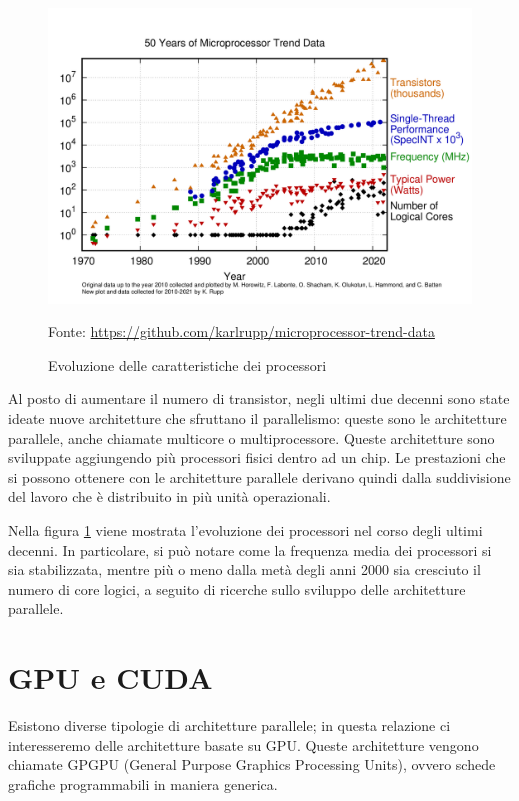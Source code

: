 \documentclass[12pt,a4paper,openright,twoside]{report}
\newcommand{\source}[1]{\vspace{-10pt} \caption*{\scriptsize Fonte: {#1}} }
\begin{document}
\begin{figure}[h]
    \centering
    \includegraphics[width=\textwidth]{50-years-processor-trend.png}
    \caption{Evoluzione delle caratteristiche dei processori}
    \source{\url{https://github.com/karlrupp/microprocessor-trend-data}}
    \label{img:trend_proc}
\end{figure}

Al posto di aumentare il numero di transistor, negli ultimi due decenni sono state ideate nuove architetture che sfruttano il parallelismo: queste sono le architetture parallele, anche chiamate multicore o multiprocessore. Queste architetture sono sviluppate aggiungendo più processori fisici dentro ad un chip. Le prestazioni che si possono ottenere con le architetture parallele derivano quindi dalla suddivisione del lavoro che è distribuito in più unità operazionali.

Nella figura \ref{img:trend_proc} viene mostrata l'evoluzione dei processori nel corso degli ultimi decenni. In particolare, si può notare come la frequenza media dei processori si sia stabilizzata, mentre più o meno dalla metà degli anni 2000 sia cresciuto il numero di core logici, a seguito di ricerche sullo sviluppo delle architetture parallele.

\section{GPU e CUDA}

Esistono diverse tipologie di architetture parallele; in questa relazione ci interesseremo delle architetture basate su GPU. Queste architetture vengono chiamate GPGPU (General Purpose Graphics Processing Units), ovvero schede grafiche programmabili in maniera generica.
\end{document}
